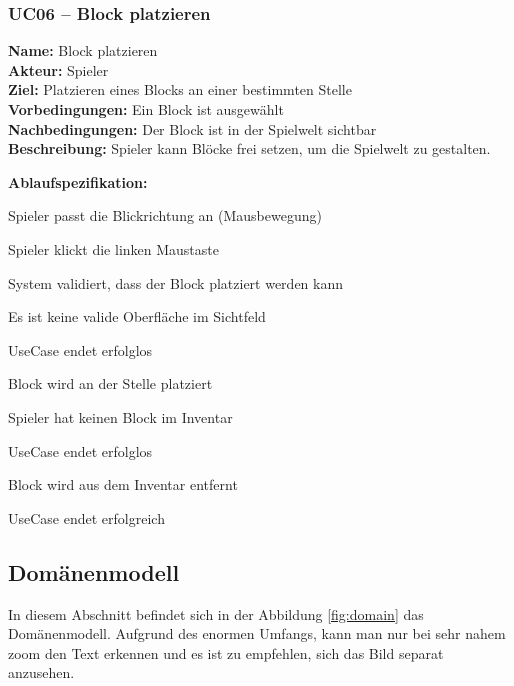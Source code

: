 \documentclass{article}
\begin{document}
\subsubsection*{UC06 – Block platzieren}

\textbf{Name:} Block platzieren \\
\textbf{Akteur:} Spieler \\
\textbf{Ziel:} Platzieren eines Blocks an einer bestimmten Stelle \\
\textbf{Vorbedingungen:} Ein Block ist ausgewählt \\
\textbf{Nachbedingungen:} Der Block ist in der Spielwelt sichtbar \\
\textbf{Beschreibung:} Spieler kann Blöcke frei setzen, um die Spielwelt zu gestalten.

\textbf{Ablaufspezifikation:}
\begin{description}[style=nextline,leftmargin=1.9cm,labelwidth=1.6cm]
  \item[1.] Spieler passt die Blickrichtung an (Mausbewegung)
  \item[2.] Spieler klickt die linken Maustaste
  \item[3.] System validiert, dass der Block platziert werden kann
  \item[3a.] Es ist keine valide Oberfläche im Sichtfeld
  \item[3a.1.] UseCase endet erfolglos
  \item[4.] Block wird an der Stelle platziert
  \item[4a.] Spieler hat keinen Block im Inventar
  \item[4a.1.] UseCase endet erfolglos
  \item[5.] Block wird aus dem Inventar entfernt
  \item[6.] UseCase endet erfolgreich
\end{description}







\subsection{Domänenmodell} \label{subsec:domain}

In diesem Abschnitt befindet sich in der Abbildung \ref{fig:domain} das Domänenmodell. Aufgrund des enormen Umfangs, kann man nur bei sehr nahem zoom den Text erkennen und es ist zu empfehlen, sich das Bild separat anzusehen.
\end{document}

